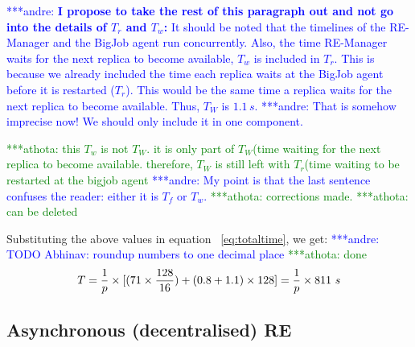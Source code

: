 \documentclass{rspublic}
\newcommand{\alnote}[1]{ {\textcolor{blue} { ***andre: #1 }}}
\newcommand{\athotanote}[1]{ {\textcolor{green} { ***athota: #1 }}}
\newcommand{\alnote}[1]{}
\newcommand{\athotanote}[1]{}
\begin{document}
\alnote{\textbf{I propose to take the rest of this paragraph out and
    not go into the details of $T_r$ and $T_w$:} It should be noted
  that the timelines of the RE-Manager and the BigJob agent run
  concurrently. Also, the time RE-Manager waits for the next replica
  to become available, $T_w$ is included in $T_r$. This is because we
  already included the time each replica waits at the BigJob agent
  before it is restarted ($T_r$). This would be the same time a
  replica waits for the next replica to become available. Thus, $T_W$
  is $1.1\,s$. } \alnote{That is somehow imprecise now! We should only
  include it in one component.} {\athotanote{this $T_w$ is not
    $T_W$. it is only part of $T_W$(time waiting for the next replica
    to become available.  therefore, $T_W$ is still left with
    $T_r$(time waiting to be restarted at the bigjob agent }
  \alnote{My point is that the last sentence confuses the reader:
    either it is $T_f$ or $T_w$.} \athotanote{corrections made.}
  \athotanote{can be deleted}





Substituting the above values in equation ~\ref{eq:totaltime}, we get:
\alnote{TODO Abhinav: roundup numbers to one decimal place} \athotanote{done}
\begin{eqnarray}
T=  {1 \over p} \times {[ {(71\times {128\over 16}}) + (0.8 + 1.1)\times 128]} = {1 \over p} \times 811~s
\label{eq:cent}
\end{eqnarray}


\subsection{Asynchronous (decentralised) RE}


}
\end{document}
